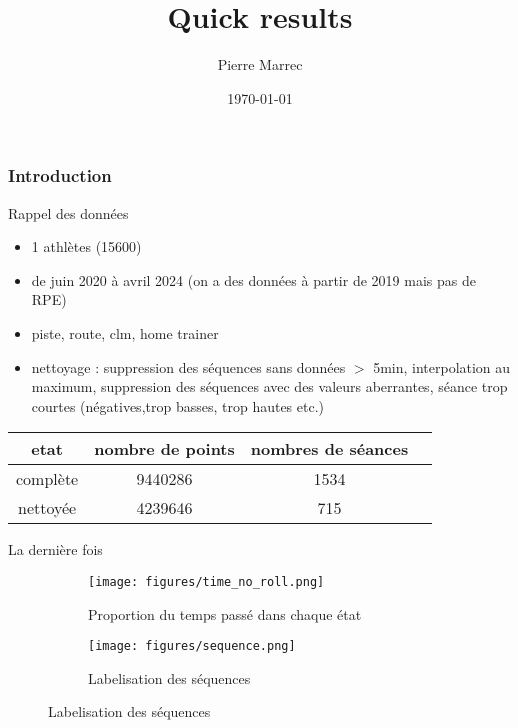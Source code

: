 \documentclass{beamer}
\begin{document}
\title{Quick results}
\author{Pierre Marrec}
\date{\today}

\begin{frame}
    \titlepage
\end{frame}

\begin{frame}
    \frametitle{Introduction}


    Rappel des données
   \begin{itemize}
    \item 1 athlètes (15600)
    \item de juin 2020 à avril 2024 (on a des données à partir de 2019 mais pas de RPE)
    \item piste, route, clm, home trainer
    \item nettoyage : suppression des séquences sans données $>$ 5min, interpolation au maximum, suppression des séquences avec des valeurs aberrantes, séance trop courtes (négatives,trop basses, trop hautes etc.)
   \end{itemize}
    \begin{table}
        \centering
        \begin{tabular}{|c|c|c|c|}
            \hline
            etat & nombre de points & nombres de séances \\
            \hline
            complète & 9440286 & 1534 \\
            nettoyée & 4239646& 715\\
            \hline
        \end{tabular}
    \end{table}




\end{frame}

\begin{frame}{La dernière fois}
    \begin{figure}
        \begin{subfigure}{0.35\textwidth}
            \texttt{[image: figures/time\_no\_roll.png]}
            \caption{Proportion du temps passé dans chaque état}
        \end{subfigure}
        \begin{subfigure}{0.6\textwidth}
            \texttt{[image: figures/sequence.png]}
            \caption{Labelisation des séquences}
        \end{subfigure}
        
    \end{figure}
\end{frame}
\end{document}
